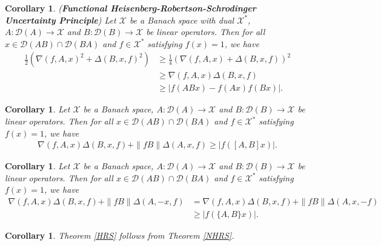 \documentclass{amsart}
\newtheorem{corollary}[theorem] {Corollary}
\begin{document}
\begin{corollary} (\textbf{Functional Heisenberg-Robertson-Schrodinger Uncertainty Principle})
	 	Let  $\mathcal{X}$ be a Banach space with dual $\mathcal{X}^*$,  $A:	\mathcal{D}(A)\to  \mathcal{X}$ and $B:	\mathcal{D}(B)\to  \mathcal{X}$  be linear  operators.  	Then  for all $x \in \mathcal{D}(AB)\cap  \mathcal{D}(BA)$ and $f \in  \mathcal{X}^*$ satisfying $f(x)=1$, we have 
	 	\begin{align*}
	 		 \frac{1}{2} \left(\nabla(f, A,x)^2+\Delta (B, x, f)^2\right)&\geq \frac{1}{4} \left(\nabla(f, A,x)+	\Delta (B, x, f)\right)^2\\
	 		&\geq \nabla(f, A,x)\Delta (B, x, f)\\
	 		&\geq |f(ABx)-f(Ax)f(Bx)|.
	 	\end{align*}
\end{corollary}
\begin{corollary}
	Let  $\mathcal{X}$ be a Banach space,  $A:	\mathcal{D}(A)\to  \mathcal{X}$ and $B:	\mathcal{D}(B)\to  \mathcal{X}$  be linear  operators.  	Then  for all $x \in \mathcal{D}(AB)\cap  \mathcal{D}(BA)$ and $f \in  \mathcal{X}^*$ satisfying $f(x)=1$, we have 
\begin{align*}
\nabla(f, A,x)\Delta (B, x, f)+\|fB\|\Delta (A, x, f)\geq |f([A,B]x)|.
\end{align*}	
\end{corollary}
\begin{corollary}
Let  $\mathcal{X}$ be a Banach space,  $A:	\mathcal{D}(A)\to  \mathcal{X}$ and $B:	\mathcal{D}(B)\to  \mathcal{X}$  be linear  operators.  	Then  for all $x \in \mathcal{D}(AB)\cap  \mathcal{D}(BA)$ and $f \in  \mathcal{X}^*$ satisfying $f(x)=1$, we have 
\begin{align*}
	\nabla(f, A,x)\Delta (B, x, f)+\|fB\|\Delta (A, -x, f)&=\nabla(f, A,x)\Delta (B, x, f)+\|fB\|\Delta (A, x, -f)\\
	&\geq |f(\{A,B\}x)|.	
\end{align*}
\end{corollary}	
\begin{corollary}
Theorem \ref{HRS} follows from Theorem \ref{NHRS}.
\end{corollary}
\end{document}
